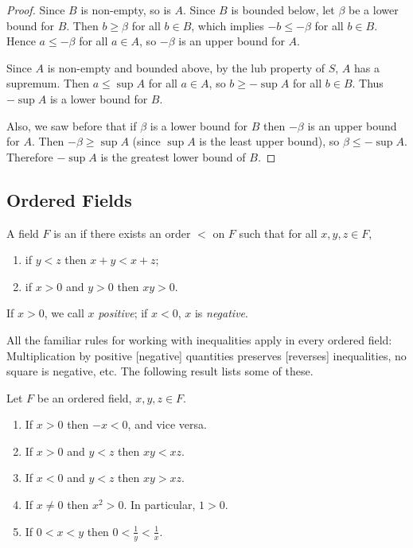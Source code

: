 \begin{proof}
Since $B$ is non-empty, so is $A$. Since $B$ is bounded below, let $\beta$ be a lower bound for $B$. Then $b\ge\beta$ for all $b\in B$, which implies $-b\le-\beta$ for all $b\in B$. Hence $a\le-\beta$ for all $a\in A$, so $-\beta$ is an upper bound for $A$.

Since $A$ is non-empty and bounded above, by the lub property of $S$, $A$ has a supremum. Then $a\le\sup A$ for all $a\in A$, so $b\ge-\sup A$ for all $b\in B$. Thus $-\sup A$ is a lower bound for $B$.

Also, we saw before that if $\beta$ is a lower bound for $B$ then $-\beta$ is an upper bound for $A$. Then $-\beta \ge \sup A$ (since $\sup A$ is the least upper bound), so $\beta \le -\sup A$. Therefore $-\sup A$ is the greatest lower bound of $B$.
\end{proof}

\subsection{Ordered Fields}
\begin{definition}
A field $F$ is an  if there exists an order $<$ on $F$ such that for all $x,y,z\in F$,
\begin{enumerate}[label=(\roman*)]
\item if $y<z$ then $x+y<x+z$;
\item if $x>0$ and $y>0$ then $xy>0$.
\end{enumerate}
\end{definition}

If $x>0$, we call $x$ \emph{positive}; if $x<0$, $x$ is \emph{negative}.

All the familiar rules for working with inequalities apply in every ordered field: Multiplication by positive [negative] quantities preserves [reverses] inequalities, no square is negative, etc. The following result lists some of these. 

\begin{proposition}\label{prop:ordered-field-properties}
Let $F$ be an ordered field, $x,y,z\in F$.
\begin{enumerate}[label=(\roman*)]
\item If $x>0$ then $-x<0$, and vice versa.
\item If $x>0$ and $y<z$ then $xy<xz$.
\item If $x<0$ and $y<z$ then $xy>xz$.
\item If $x\neq0$ then $x^2>0$. In particular, $1>0$.
\item If $0<x<y$ then $0<\frac{1}{y}<\frac{1}{x}$.
\end{enumerate}
\end{proposition}

